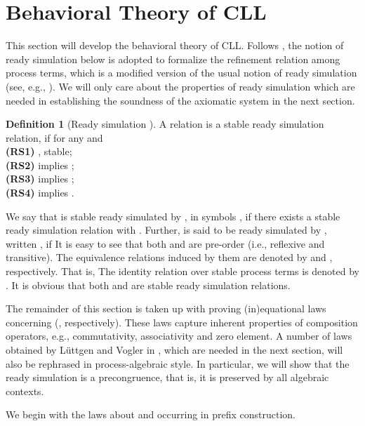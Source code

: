 \documentclass{elsarticle}
\theoremstyle{plain}
\theoremstyle{definition}
\newtheorem{mydefn}[theorem]{Definition}
\begin{document}
\section{Behavioral Theory of CLL}

This section will develop the behavioral theory of CLL. Follows \cite{Luttgen10}, the notion of ready simulation below is adopted to formalize the refinement relation among process terms, which is a modified version of the usual notion of ready simulation (see, e.g., \cite{Glabbeek01}).
We will only care about the properties of ready simulation which are needed in establishing the soundness of the axiomatic system  in the next section.

\begin{mydefn}[Ready simulation \cite{Luttgen10}]\label{D:READYSIMULATION_TERMS}
A relation  is a stable ready simulation relation, if for any  and \\
\textbf{(RS1)} ,  stable;\\
\textbf{(RS2)}  implies ;\\
\textbf{(RS3)}  implies ;\\
\textbf{(RS4)}  implies .
\end{mydefn}

 We say that  is stable ready simulated by , in symbols , if there exists a stable ready simulation relation  with .
 Further,  is said to be ready simulated by , written , if 
 It is easy to see that both  and  are pre-order (i.e., reflexive and transitive). The equivalence relations induced by them are denoted by  and , respectively.
 That is,  The identity relation over stable process terms is denoted by .
 It is obvious that both  and  are stable ready simulation relations.


 The remainder of this section is taken up with proving (in)equational laws concerning  (, respectively).
 These laws capture inherent properties of composition operators, e.g., commutativity, associativity and zero element.
 A number of laws obtained by L\"{u}ttgen and Vogler in \cite{Luttgen10}, which are needed in the next section, will also be rephrased in process-algebraic style.
 In particular, we will show that the ready simulation is a precongruence, that is, it is preserved by all algebraic contexts.

We begin with the laws about  and  occurring in prefix construction.
\end{document}
